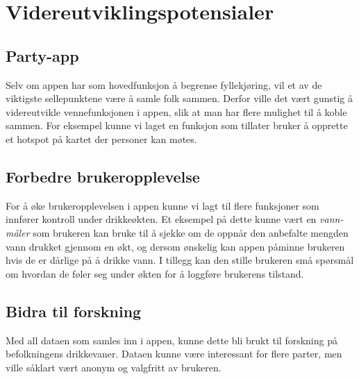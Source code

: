 \section{Videreutviklingspotensialer}
\subsection{Party-app}
Selv om appen har som hovedfunksjon å begrense fyllekjøring, vil et av de viktigste sellepunktene være å samle folk sammen. Derfor ville det vært gunstig å videreutvikle vennefunksjonen i appen, slik at man har flere mulighet til å koble sammen. For eksempel kunne vi laget en funksjon som tillater bruker å opprette et hotspot på kartet der personer kan møtes.

\subsection{Forbedre brukeropplevelse}
For å øke brukeropplevelsen i appen kunne vi lagt til flere funksjoner som innfører kontroll under drikkeøkten. Et eksempel på dette kunne vært en \textit{vann-måler} som brukeren kan bruke til å sjekke om de oppnår den anbefalte mengden vann drukket gjennom en økt, og dersom ønskelig kan appen påminne brukeren hvis de er dårlige på å drikke vann. I tillegg kan den stille brukeren små spørsmål om hvordan de føler seg under økten for å loggføre brukerens tilstand.

\subsection{Bidra til forskning}
Med all dataen som samles inn i appen, kunne dette bli brukt til forskning på befolkningens drikkevaner. Dataen kunne være interessant for flere parter, men ville såklart vært anonym og valgfritt av brukeren.

